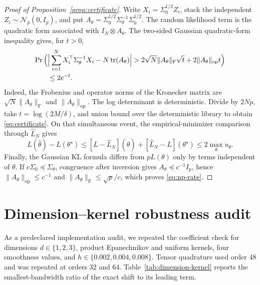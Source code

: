 \documentclass[sigconf]{acmart}
\theoremstyle{remark}
\newcommand{\tr}{\operatorname{tr}}
\newcommand{\Normal}{\mathcal N}
\begin{document}
\begin{proof}[Proof of Proposition~\ref{prop:certificate}]
Write \(X_i=\Sigma_0^{1/2}Z_i\), stack the independent
\(Z_i\sim\Normal_p(0,I_p)\), and put
\(A_\theta=\Sigma_0^{1/2}\Sigma_\theta^{-1}\Sigma_0^{1/2}\).
The random likelihood term is the quadratic form associated with
\(I_N\otimes A_\theta\).  The two-sided Gaussian quadratic-form inequality
gives, for \(t>0\),
\begin{align}
 \Pr\Big(&\Big|\sum_{i=1}^N
 X_i^\top\Sigma_\theta^{-1}X_i-N\tr(A_\theta)\Big|
 >2\sqrt N\lVert A_\theta\rVert_{\mathrm F}\sqrt t
 +2\lVert A_\theta\rVert_{\mathrm{op}}t\Big)\notag\\
 &\leq2e^{-t}.
\end{align}
Indeed, the Frobenius and operator norms of the Kronecker matrix are
\(\sqrt N\lVert A_\theta\rVert_{\mathrm F}\) and
\(\lVert A_\theta\rVert_{\mathrm{op}}\).  The log determinant is
deterministic.  Divide by \(2Np\), take \(t=\log(2M/\delta)\), and union
bound over the deterministic library to obtain \eqref{eq:certificate}.  On
that simultaneous
event, the empirical-minimizer comparison through \(\widehat L_N\) gives
\[
 L(\widehat\theta)-L(\theta^\star)
 \leq [L-\widehat L_N](\widehat\theta)
 +[\widehat L_N-L](\theta^\star)
 \leq2\max_\theta u_\theta.
\]
Finally, the Gaussian KL formula differs from \(pL(\theta)\) only by terms
independent of \(\theta\).  If
\(c\Sigma_0\preceq\Sigma_\theta\), congruence after inversion gives
\(A_\theta\preceq c^{-1}I_p\), hence
\(\lVert A_\theta\rVert_{\mathrm{op}}\leq c^{-1}\) and
\(\lVert A_\theta\rVert_{\mathrm F}\leq\sqrt p/c\), which proves
\eqref{eq:np-rate}.
\end{proof}

\section{Dimension--kernel robustness audit}
\label{app:dimension-kernel-audit}

As a predeclared implementation audit, we repeated the coefficient check for
dimensions \(d\in\{1,2,3\}\), product Epanechnikov and uniform kernels,
four smoothness values, and \(h\in\{0.002,0.004,0.008\}\). Tensor quadrature
used order 48 and was repeated at orders 32 and 64. Table~\ref{tab:dimension-kernel}
reports the smallest-bandwidth ratio of the exact shift to its leading term.

\begin{table}[H]
\centering
\small
\caption{Coefficient-ratio ranges in the 72-cell robustness audit.}
\label{tab:dimension-kernel}

\end{table}
\end{document}
